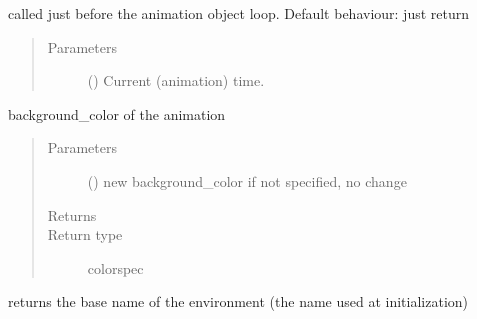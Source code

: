 \documentclass[letterpaper,10pt,english]{sphinxmanual}
\begin{document}
\begin{fulllineitems}
\begin{fulllineitems}
\begin{quote}
\begin{description}
\end{description}\end{quote}

\end{fulllineitems}


\begin{fulllineitems}
\label{\detokenize{Reference:salabim.Environment.animation_pre_tick}}
called just before the animation object loop. 
Default behaviour: just return
\begin{quote}\begin{description}
\item[{Parameters}] \leavevmode
{} () \textendash{} Current (animation) time.

\end{description}\end{quote}

\end{fulllineitems}


\begin{fulllineitems}
\label{\detokenize{Reference:salabim.Environment.background_color}}
background\_color of the animation
\begin{quote}\begin{description}
\item[{Parameters}] \leavevmode
{} () \textendash{} new background\_color 
if not specified, no change

\item[{Returns}] \leavevmode
{}

\item[{Return type}] \leavevmode
colorspec

\end{description}\end{quote}

\end{fulllineitems}


\begin{fulllineitems}
\label{\detokenize{Reference:salabim.Environment.base_name}}
returns the base name of the environment (the name used at initialization)


\end{fulllineitems}
\end{fulllineitems}
\end{document}
